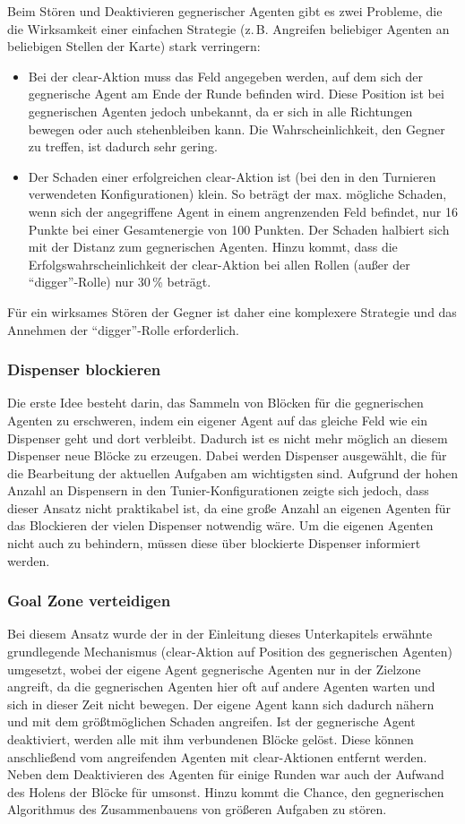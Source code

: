 \documentclass[runningheads]{llncs}
\begin{document}
Beim Stören und Deaktivieren gegnerischer Agenten gibt es zwei Probleme, die die Wirksamkeit einer einfachen Strategie (z.\,B. Angreifen beliebiger Agenten an beliebigen Stellen der Karte) stark verringern:
\begin{itemize}
\item{Bei der clear-Aktion muss das Feld angegeben werden, auf dem sich der gegnerische Agent am Ende der Runde befinden wird. Diese Position ist bei gegnerischen Agenten jedoch unbekannt, da er sich in alle Richtungen bewegen oder auch stehenbleiben kann. Die Wahrscheinlichkeit, den Gegner zu treffen, ist dadurch sehr gering.}
\item{Der Schaden einer erfolgreichen clear-Aktion ist (bei den in den Turnieren verwendeten Konfigurationen) klein. So beträgt der max. mögliche Schaden, wenn sich der angegriffene Agent in einem angrenzenden Feld befindet, nur 16 Punkte bei einer Gesamtenergie von 100 Punkten. Der Schaden halbiert sich mit der Distanz zum gegnerischen Agenten. Hinzu kommt, dass die Erfolgswahrscheinlichkeit der clear-Aktion bei allen Rollen (außer der "`digger"'-Rolle) nur 30\,\% beträgt.}
\end{itemize}
Für ein wirksames Stören der Gegner ist daher eine komplexere Strategie und das Annehmen der "`digger"'-Rolle erforderlich.
\subsubsection{Dispenser blockieren}
Die erste Idee besteht darin, das Sammeln von Blöcken für die gegnerischen Agenten zu erschweren, indem ein eigener Agent auf das gleiche Feld wie ein Dispenser geht und dort verbleibt. Dadurch ist es nicht mehr möglich an diesem Dispenser neue Blöcke zu erzeugen. Dabei werden Dispenser ausgewählt, die für die Bearbeitung der aktuellen Aufgaben am wichtigsten sind. Aufgrund der hohen Anzahl an Dispensern in den Tunier-Konfigurationen zeigte sich jedoch, dass dieser Ansatz nicht praktikabel ist, da eine große Anzahl an eigenen Agenten für das Blockieren der vielen Dispenser notwendig wäre. Um die eigenen Agenten nicht auch zu behindern, müssen diese über blockierte Dispenser informiert werden.

\subsubsection{Goal Zone verteidigen}
Bei diesem Ansatz wurde der in der Einleitung dieses Unterkapitels erwähnte grundlegende Mechanismus (clear-Aktion auf Position des gegnerischen Agenten) umgesetzt, wobei der eigene Agent gegnerische Agenten nur in der Zielzone angreift, da die gegnerischen Agenten hier oft auf andere Agenten warten und sich in dieser Zeit nicht bewegen. Der eigene Agent kann sich dadurch nähern und mit dem größtmöglichen Schaden angreifen. Ist der gegnerische Agent deaktiviert, werden alle mit ihm verbundenen Blöcke gelöst. Diese können anschließend vom angreifenden Agenten mit clear-Aktionen entfernt werden. Neben dem Deaktivieren des Agenten für einige Runden war auch der Aufwand des Holens der Blöcke für umsonst. Hinzu kommt die Chance, den gegnerischen Algorithmus des Zusammenbauens von größeren Aufgaben zu stören.
\end{document}
